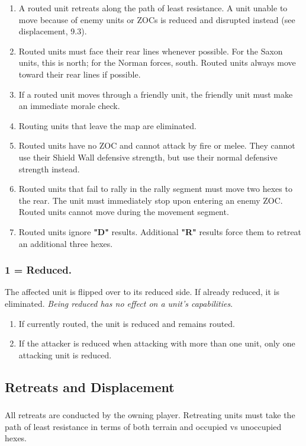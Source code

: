 \begin{enumerate}
  \item A routed unit retreats along the path of least resistance. A unit unable to move because of enemy units or ZOCs is reduced and disrupted instead (see displacement, 9.3).
  \item Routed units must face their rear lines whenever possible. For the Saxon units, this is north; for the Norman forces, south. Routed units always move toward their rear lines if possible.
  \item If a routed unit moves through a friendly unit, the friendly unit must make an immediate morale check.
  \item Routing units that leave the map are eliminated.
  \item Routed units have no ZOC and cannot attack by fire or melee. They cannot use their Shield Wall defensive strength, but use their normal defensive strength instead.
  \item Routed units that fail to rally in the rally segment must move two hexes to the rear. The unit must immediately stop upon entering an enemy ZOC. Routed units cannot move during the movement segment.
  \item Routed units ignore \textbf{"D"} results. Additional \textbf{"R"} results force them to retreat an additional three hexes.
\end{enumerate}

\subsubsection[Reduced]{1 = Reduced.} The affected unit is flipped over to its reduced side. If already reduced, it is eliminated. \textit{Being reduced has no effect on a unit's capabilities}.

\begin{enumerate}
  \item If currently routed, the unit is reduced and remains routed.
  \item If the attacker is reduced when attacking with more than one unit, only one attacking unit is reduced.
\end{enumerate}

\subsection{Retreats and Displacement}

\subsubsection[Owning Player]{} All retreats are conducted by the owning player. Retreating units must take the path of least resistance in terms of both terrain and occupied vs unoccupied hexes.

